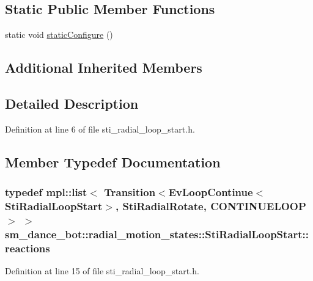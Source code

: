 \subsection*{Static Public Member Functions}
\begin{DoxyCompactItemize}
\item 
static void \hyperlink{structsm__dance__bot_1_1radial__motion__states_1_1StiRadialLoopStart_a5ff99328ae5482be3b666166f9ca769b}{static\+Configure} ()
\end{DoxyCompactItemize}
\subsection*{Additional Inherited Members}


\subsection{Detailed Description}


Definition at line 6 of file sti\+\_\+radial\+\_\+loop\+\_\+start.\+h.



\subsection{Member Typedef Documentation}
\subsubsection[{\texorpdfstring{reactions}{reactions}}]{\setlength{\rightskip}{0pt plus 5cm}typedef mpl\+::list$<$ Transition$<$Ev\+Loop\+Continue$<${\bf Sti\+Radial\+Loop\+Start}$>$, {\bf Sti\+Radial\+Rotate}, C\+O\+N\+T\+I\+N\+U\+E\+L\+O\+OP$>$ $>$ {\bf sm\+\_\+dance\+\_\+bot\+::radial\+\_\+motion\+\_\+states\+::\+Sti\+Radial\+Loop\+Start\+::reactions}}\hypertarget{structsm__dance__bot_1_1radial__motion__states_1_1StiRadialLoopStart_a817d8c91080ccf4ff0f387455d26f94c}{}\label{structsm__dance__bot_1_1radial__motion__states_1_1StiRadialLoopStart_a817d8c91080ccf4ff0f387455d26f94c}


Definition at line 15 of file sti\+\_\+radial\+\_\+loop\+\_\+start.\+h.



